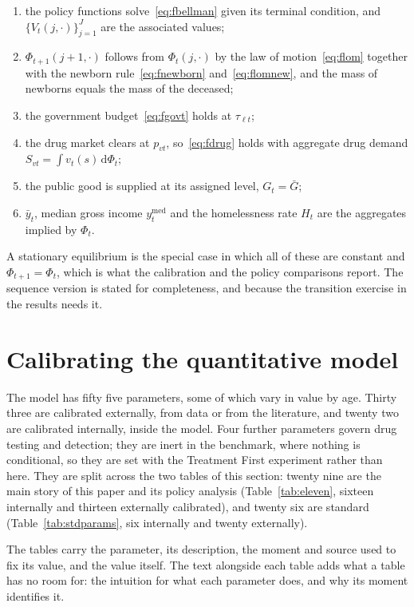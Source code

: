 \documentclass[10pt]{article}
\begin{document}
\begin{enumerate}\setlength{\itemsep}{0.1em}\setlength{\parskip}{0em}
\item the policy functions solve~\eqref{eq:fbellman} given its terminal
condition, and $\{V_t(j,\cdot)\}_{j=1}^{J}$ are the associated values;
\item $\Phi_{t+1}(j{+}1,\cdot)$ follows from $\Phi_t(j,\cdot)$ by the law of motion~\eqref{eq:flom}
together with the newborn rule~\eqref{eq:fnewborn} and~\eqref{eq:flomnew}, and
the mass of newborns equals the mass of the deceased;
\item the government budget~\eqref{eq:fgovt} holds at $\tau_{\ell t}$;
\item the drug market clears at $p_{vt}$, so~\eqref{eq:fdrug} holds with
aggregate drug demand $S_{vt}=\int v_t(s)\,\mathrm{d}\Phi_t$;
\item the public good is supplied at its assigned level, $G_t=\bar G$;
\item $\bar y_t$, median gross income $y^{\text{med}}_t$ and the homelessness
rate $H_t$ are the aggregates implied by $\Phi_t$.
\end{enumerate}

A stationary equilibrium is the special case in which all of these are
constant and $\Phi_{t+1}=\Phi_t$, which is what the calibration and the policy
comparisons report. The sequence version is stated for completeness, and
because the transition exercise in the results needs it.

\section{Calibrating the quantitative model}\label{sec:fullcal}

The model has fifty five parameters, some of which vary in value by
age. Thirty three are calibrated externally, from data or from the
literature, and twenty two are calibrated internally, inside the model. Four further parameters
govern drug testing and detection; they are inert in the benchmark, where nothing
is conditional, so they are set with the Treatment First experiment rather than
here. They are
split across the two tables of this section: twenty nine are the main story
of this paper and its policy analysis (Table~\ref{tab:eleven}, sixteen
internally and thirteen externally calibrated), and twenty six are standard
(Table~\ref{tab:stdparams}, six internally and twenty externally).

The tables carry the parameter, its description, the moment and source used to
fix its value, and the value itself. The text alongside each table adds what a
table has no room for: the intuition for what each parameter does, and why its
moment identifies it.
\end{document}
